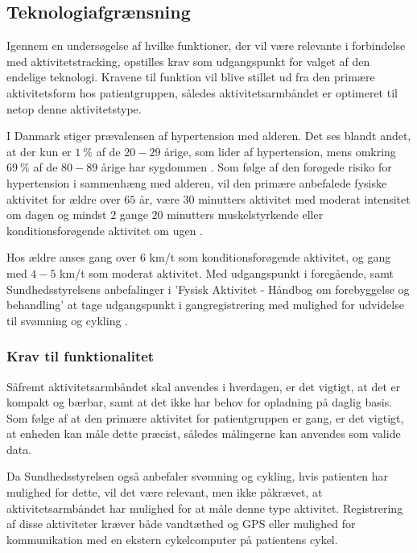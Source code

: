 \subsection{Teknologiafgrænsning}

Igennem en undersøgelse af hvilke funktioner, der vil være relevante i forbindelse med aktivitetstracking, opstilles krav som udgangspunkt for valget af den endelige teknologi. Kravene til funktion vil blive stillet ud fra den primære aktivitetsform hos patientgruppen, således aktivitetsarmbåndet er optimeret til netop denne aktivitetstype.

I Danmark stiger prævalensen af hypertension med alderen. Det ses blandt andet, at der kun er $1~\%$ af de $20-29$ årige, som lider af hypertension, mens omkring $69~\%$ af de $80-89$ årige har sygdommen \citep{olsen2015}. Som følge af den forøgede risiko for hypertension i sammenhæng med alderen, vil den primære anbefalede fysiske aktivitet for ældre over $65$ år, være $30$ minutters aktivitet med moderat intensitet om dagen og mindst $2$ gange $20$ minutters muskelstyrkende eller konditionsforøgende aktivitet om ugen \citep{pedersen2011}.

Hos ældre anses gang over $6$ km/t som konditionsforøgende aktivitet, og gang med $4-5$ km/t som moderat aktivitet. Med udgangspunkt i foregående, samt Sundhedsstyrelsens anbefalinger i 'Fysisk Aktivitet - Håndbog om forebyggelse og behandling' at tage udgangspunkt i gangregistrering med mulighed for udvidelse til svømning og cykling \citep{pedersen2011}.

\subsubsection{Krav til funktionalitet}

Såfremt aktivitetsarmbåndet skal anvendes i hverdagen, er det vigtigt, at det er kompakt og bærbar, samt at det ikke har behov for opladning på daglig basis. Som følge af at den primære aktivitet for patientgruppen er gang, er det vigtigt, at enheden kan måle dette præcist, således målingerne kan anvendes som valide data. 

Da Sundhedsstyrelsen også anbefaler svømning og cykling, hvis patienten har mulighed for dette, vil det være relevant, men ikke påkrævet, at aktivitetsarmbåndet har mulighed for at måle denne type aktivitet. Registrering af disse aktiviteter kræver både vandtæthed og GPS eller mulighed for kommunikation med en ekstern cykelcomputer på patientens cykel.

